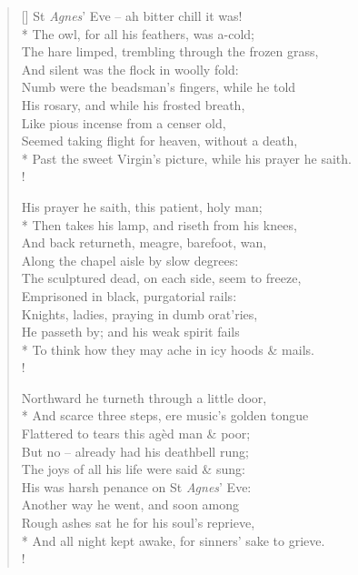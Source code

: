\documentclass[MAIN]{subfiles}
\begin{document}
\settowidth{\versewidth}{Past the sweet Virgin's picture, while his prayer he saith.}
\begin{verse}[\versewidth]
\vin St \emph{Agnes}' Eve -- ah bitter chill it was!\\* 
\vin The owl, for all his feathers, was a-cold;\\
\vin The hare limped, trembling through the frozen grass,\\
\vin And silent was the flock in woolly fold:\\
\vin Numb were the beadsman's fingers, while he told\\
\vin His rosary, and while his frosted breath,\\
\vin Like pious incense from a censer old,\\
\vin Seemed taking flight for heaven, without a death,\\*
Past the sweet Virgin's picture, while his prayer he saith.\\!

\vin His prayer he saith, this patient, holy man;\\*
\vin Then takes his lamp, and riseth from his knees,\\
\vin And back returneth, meagre, barefoot, wan,\\
\vin Along the chapel aisle by slow degrees:\\
\vin The sculptured dead, on each side, seem to freeze,\\
\vin Emprisoned in black, purgatorial rails:\\
\vin Knights, ladies, praying in dumb orat'ries,\\
\vin He passeth by; and his weak spirit fails\\*
To think how they may ache in icy hoods \& mails.\\!

\vin Northward he turneth through a little door,\\*
\vin And scarce three steps, ere music's golden tongue\\
\vin Flattered to tears this ag\`ed man \& poor;\\
\vin But no -- already had his deathbell rung;\\
\vin The joys of all his life were said \& sung:\\
\vin His was harsh penance on St \emph{Agnes}' Eve:\\
\vin Another way he went, and soon among\\
\vin Rough ashes sat he for his soul's reprieve,\\*
And all night kept awake, for sinners' sake to grieve.\\!


\end{verse}
\end{document}
